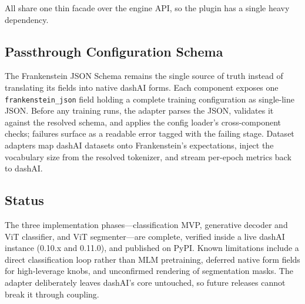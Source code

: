 All share one thin facade over the engine API, so the plugin has a single heavy dependency.

\subsection{Passthrough Configuration Schema}

The Frankenstein JSON Schema remains the single source of truth instead of translating its fields into native dashAI forms. Each component exposes one \texttt{frankenstein\_json} field holding a complete training configuration as single-line JSON. Before any training runs, the adapter parses the JSON, validates it against the resolved schema, and applies the config loader's cross-component checks; failures surface as a readable error tagged with the failing stage. Dataset adapters map dashAI datasets onto Frankenstein's expectations, inject the vocabulary size from the resolved tokenizer, and stream per-epoch metrics back to dashAI.

\subsection{Status}

The three implementation phases---classification MVP, generative decoder and ViT classifier, and ViT segmenter---are complete, verified inside a live dashAI instance (0.10.x and 0.11.0), and published on PyPI. Known limitations include a direct classification loop rather than MLM pretraining, deferred native form fields for high-leverage knobs, and unconfirmed rendering of segmentation masks. The adapter deliberately leaves dashAI's core untouched, so future releases cannot break it through coupling.
